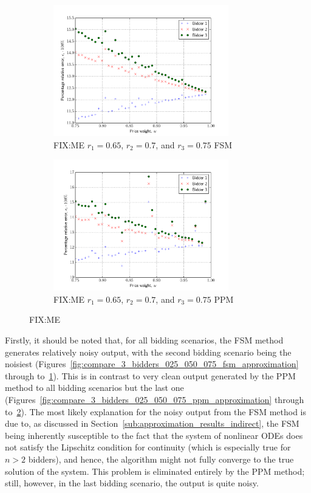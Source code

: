 \begin{figure}[p!]
  \begin{subfigure}[b]{0.5\textwidth}
    \includegraphics[width=3in]{Approximation/Figures/compare_3_bidders_065_070_075}
    \caption{FIX:ME $r_1=0.65$, $r_2=0.7$, and $r_3=0.75$ FSM}
    \label{fig:compare_3_bidders_065_070_075_fsm_approximation}
  \end{subfigure}
  \begin{subfigure}[b]{0.5\textwidth}
    \includegraphics[width=3in]{Approximation/Figures/compare_3_bidders_065_070_075_ppm}
    \caption{FIX:ME $r_1=0.65$, $r_2=0.7$, and $r_3=0.75$ PPM}
    \label{fig:compare_3_bidders_065_070_075_ppm_approximation}
  \end{subfigure}
  \caption{FIX:ME}
  \label{fig:compare_3_bidders_065_070_075_approximation}
\end{figure}

Firstly, it should be noted that, for all bidding scenarios, the FSM method generates relatively noisy output, with the second bidding scenario being the noisiest (Figures~\ref{fig:compare_3_bidders_025_050_075_fsm_approximation} through to~\ref{fig:compare_3_bidders_065_070_075_fsm_approximation}). This is in contrast to very clean output generated by the PPM method to all bidding scenarios but the last one (Figures~\ref{fig:compare_3_bidders_025_050_075_ppm_approximation} through to~\ref{fig:compare_3_bidders_065_070_075_ppm_approximation}). The most likely explanation for the noisy output from the FSM method is due to, as discussed in Section~\ref{sub:approximation_results_indirect}, the FSM being inherently susceptible to the fact that the system of nonlinear ODEs does not satisfy the Lipschitz condition for continuity (which is especially true for $n>2$ bidders), and hence, the algorithm might not fully converge to the true solution of the system. This problem is eliminated entirely by the PPM method; still, however, in the last bidding scenario, the output is quite noisy.

